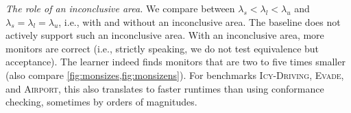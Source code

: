 \documentclass[runningheads]{llncs}
\newcommand{\sj}[2][]{\todo[color=red!50!white,#1]{\footnotesize{SJ: #2}}}
\newcommand{\lm}[2][]{\todo[color=cyan!50!white,#1]{\footnotesize{Luko: #2}}}
\renewcommand{\paragraph}[1]{\smallskip\noindent\emph{#1}}
\newcommand{\alg}{ToVer\xspace}
\begin{document}
%




\paragraph{The role of an inconclusive area.}
We compare between $\lambda_s<\lambda_l<\lambda_u$ and $\lambda_s = \lambda_l = \lambda_u$, i.e., with and without an inconclusive area. The baseline does not actively support such an inconclusive area. With an inconclusive area, more monitors are correct (i.e., strictly speaking, we do not test equivalence but acceptance). The learner indeed finds monitors that are two to five times smaller (also compare \cref{fig:monsizes,fig:monsizens}). For benchmarks \textsc{Icy-Driving}, \textsc{Evade}, and \textsc{Airport}, this also translates to faster runtimes than using conformance checking, sometimes by orders of magnitudes.

\end{document}
